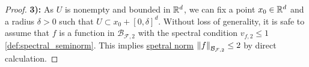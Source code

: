 \begin{proof}







\textbf{3):} As $U$ is nonempty and bounded in $\mathbb{R}^d$, we can fix a point $x_0
\in \mathbb{R}^d$ and a radius $\delta > 0$ such that $U \subset x_0 + [0,\delta]^d$.
Without loss of generality, it is safe to assume that $f$ is a function in
$\mathcal{B}_{\mathcal{F},2}$ with the spectral condition $v_{f,2}\leq 1$
\eqref{def:spectral_seminorm}. This implies \hyperref[def:spectral_norm]{spetral
norm} $\left\| f \right\|_{\mathcal{B}_{\mathcal{F}, 2}} \leq 2$ by direct calculation. 


\end{proof}
